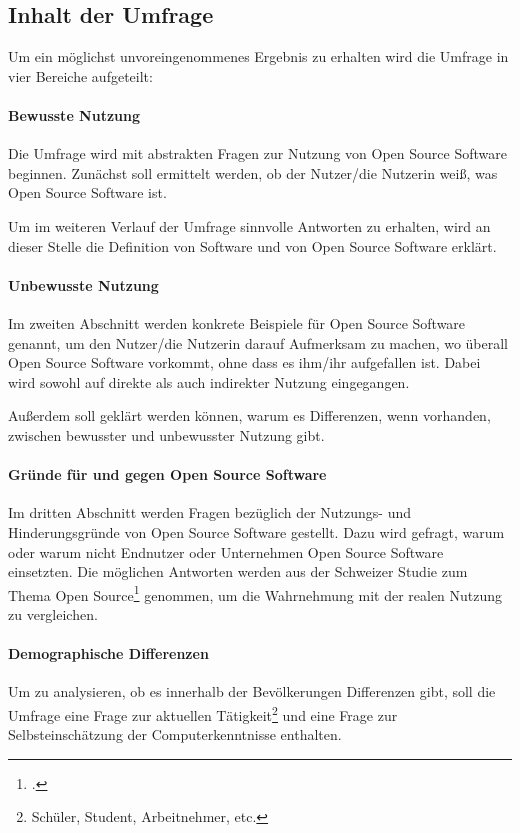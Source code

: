 \documentclass[a4paper]{article}
\begin{document}
		\subsection{Inhalt der Umfrage}
			Um ein möglichst unvoreingenommenes Ergebnis zu erhalten wird die Umfrage in vier Bereiche aufgeteilt:
		   
			\paragraph{Bewusste Nutzung}
				Die Umfrage wird mit abstrakten Fragen zur Nutzung von Open Source Software beginnen. Zunächst soll ermittelt werden, ob der Nutzer/die Nutzerin weiß, was Open Source Software ist.
			
				Um im weiteren Verlauf der Umfrage sinnvolle Antworten zu erhalten, wird an dieser Stelle die Definition von Software und von Open Source Software erklärt.
			
			
			\paragraph{Unbewusste Nutzung}
				Im zweiten Abschnitt werden konkrete Beispiele für Open Source Software genannt, um den Nutzer/die Nutzerin  darauf Aufmerksam zu machen, wo überall Open Source Software vorkommt, ohne dass es ihm/ihr aufgefallen ist. Dabei wird sowohl auf direkte als auch indirekter Nutzung eingegangen.
			
				Außerdem soll geklärt werden können, warum es Differenzen, wenn vorhanden, zwischen bewusster und unbewusster Nutzung gibt.
			
			\paragraph{Gründe für und gegen Open Source Software}
				Im dritten Abschnitt werden Fragen bezüglich der Nutzungs- und Hinderungsgründe von Open Source Software gestellt. Dazu wird gefragt, warum oder warum nicht Endnutzer oder Unternehmen Open Source Software einsetzten. Die möglichen Antworten werden aus der Schweizer Studie zum Thema Open Source\footcite{oss:studie} genommen, um die Wahrnehmung mit der realen Nutzung zu vergleichen.
			
			\paragraph{Demographische Differenzen}
				Um zu analysieren, ob es innerhalb der Bevölkerungen Differenzen gibt, soll die Umfrage eine Frage zur aktuellen Tätigkeit\footnote{Schüler, Student, Arbeitnehmer, etc.} und eine Frage zur Selbsteinschätzung der Computerkenntnisse enthalten.
				
\end{document}
